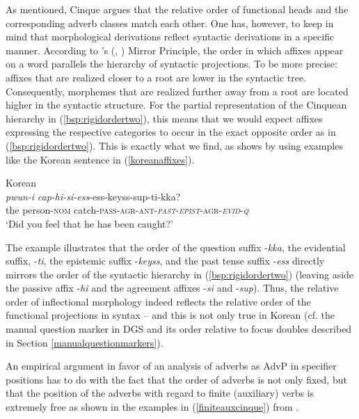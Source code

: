 \noindent As mentioned, Cinque argues that the relative order of functional heads and the corresponding adverb classes match each other. One has, however, to keep in mind that morphological derivations reflect syntactic derivations in a specific manner. According to \citeauthor{baker1985mirror}'s (\citeyear{baker1985mirror}, \citeyear{baker1988}) Mirror Principle, the order in which affixes appear on a word parallels the hierarchy of syntactic projections. To be more precise: affixes that are realized closer to a root are lower in the syntactic tree. Consequently, morphemes that are realized further away from a root are located higher in the syntactic structure. For the partial representation of the Cinquean hierarchy in (\ref{bsp:rigidordertwo}), this means that we would expect affixes expressing the respective categories to occur in the exact opposite order as in (\ref{bsp:rigidordertwo}). This is exactly what we find, as \citet[53]{cinque1999adverbs} shows by using examples like the Korean sentence in (\ref{koreanaffixes}).

\begin{exe}
\ex Korean \citep[300]{sohn1994korean} \\  {\textit{pwun-i}} {\textit{cap-hi-si-ess}-ess-keyss-sup-ti-kka?}  \\
{the} {person-\textsc{nom}} {catch-\textsc{pass-agr-ant-\textit{past}-\textit{epist}-agr-\textit{evid}-\textit{q}}}  \\
\trans `Did you feel that he has been caught?' \label{koreanaffixes}
\end{exe}

\noindent The example illustrates that the order of the question suffix -\textit{kka}, the evidential suffix, -\textit{ti}, the epistemic suffix -\textit{keyss}, and the past tense suffix -\textit{ess} directly mirrors the order of the syntactic hierarchy in (\ref{bsp:rigidordertwo}) (leaving aside the passive affix -\textit{hi} and the agreement affixes -\textit{si} and -\textit{sup}). Thus, the relative order of inflectional morphology indeed reflects the relative order of the functional projections in syntax -- and this is not only true in Korean (cf. the manual question marker in DGS and its order relative to focus doubles described in Section \ref{manualquestionmarkers}).

An empirical argument in favor of an analysis of adverbs as AdvP in specifier positions has to do with the fact that the order of adverbs is not only fixed, but that the position of the adverbs with regard to finite (auxiliary) verbs is extremely free as shown in the examples in (\ref{finiteauxcinque}) from \citet[49]{cinque1999adverbs}.

